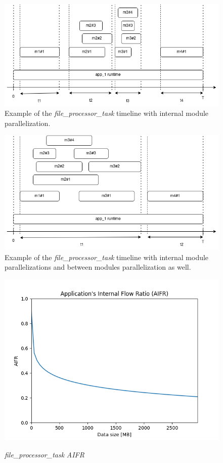 \documentclass{article}
\begin{document}
	\begin{figure}[!htb]
		\caption{Example of the \textit{file\_processor\_task} timeline with internal module parallelization.}
		\label{fig:timeline}
		\centering
		\includegraphics[width=1\textwidth]{timeline}
	\end{figure}
	\begin{figure}[!htb]
		\caption{Example of the \textit{file\_processor\_task} timeline with internal module parallelizations and between modules parallelization as well.}
		\label{fig:timeline_2}
		\centering
		\includegraphics[width=1\textwidth]{timeline_2}
	\end{figure}
	\begin{figure}[h]
		\caption{\textit{file\_processor\_task} \textit{AIFR}}
		\centering
		\includegraphics[width=1\textwidth]{AIFR}
		\label{fig:aifr}
	\end{figure}
	\newpage
	
\end{document}
